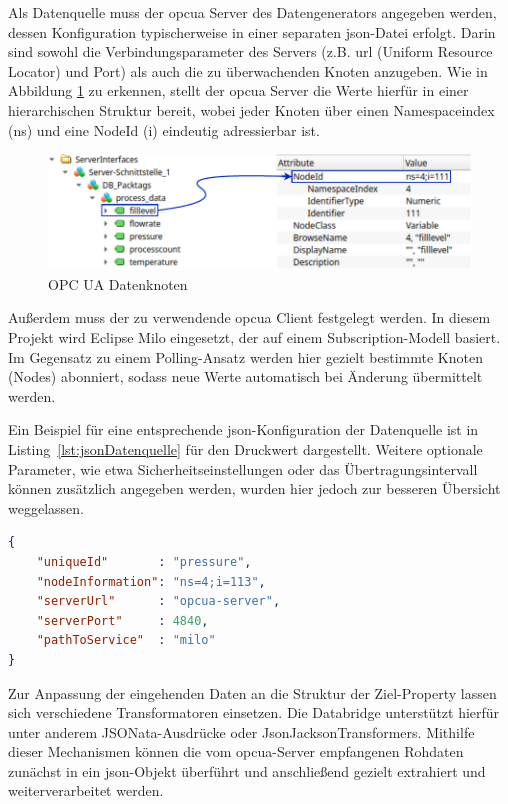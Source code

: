 Als Datenquelle muss der \acs{opcua} Server des Datengenerators angegeben werden, dessen Konfiguration typischerweise in einer separaten \acs{json}-Datei erfolgt.
Darin sind sowohl die Verbindungsparameter des Servers (z.B. \acs{url} (Uniform Resource Locator) und Port) als auch die zu überwachenden Knoten anzugeben.
Wie in Abbildung \ref{fig:OPCUADatenStruktur} zu erkennen, stellt der \acs{opcua} Server die Werte hierfür in einer hierarchischen Struktur bereit, wobei jeder Knoten über einen Namespaceindex (ns) und eine NodeId (i) eindeutig adressierbar ist.

\begin{figure}[htbp]
    \centering
    \includegraphics{Bilder/OPCUA/OPCUADaten.pdf}
    \caption{OPC UA Datenknoten}
    \label{fig:OPCUADatenStruktur}
\end{figure}

Außerdem muss der zu verwendende \acs{opcua} Client festgelegt werden.
In diesem Projekt wird Eclipse Milo eingesetzt, der auf einem Subscription-Modell basiert.
Im Gegensatz zu einem Polling-Ansatz werden hier gezielt bestimmte Knoten (Nodes) abonniert, sodass neue Werte automatisch bei Änderung übermittelt werden.

Ein Beispiel für eine entsprechende \acs{json}-Konfiguration der Datenquelle ist in Listing~\ref{lst:jsonDatenquelle} für den Druckwert dargestellt.
Weitere optionale Parameter, wie etwa Sicherheitseinstellungen oder das Übertragungsintervall können zusätzlich angegeben werden, wurden hier jedoch zur besseren Übersicht weggelassen.

\newpage
\begin{lstlisting}[language=json, caption={Beispielhafte \acs{json}-Konfiguration einer Datenquelle}, label={lst:jsonDatenquelle}]
{
    "uniqueId"       : "pressure",
    "nodeInformation": "ns=4;i=113",
    "serverUrl"      : "opcua-server",
    "serverPort"     : 4840,
    "pathToService"  : "milo"
}
\end{lstlisting}

Zur Anpassung der eingehenden Daten an die Struktur der Ziel-Property lassen sich verschiedene Transformatoren einsetzen.
Die Databridge unterstützt hierfür unter anderem JSONata-Ausdrücke oder JsonJacksonTransformers.
Mithilfe dieser Mechanismen können die vom \acs{opcua}-Server empfangenen Rohdaten zunächst in ein \acs{json}-Objekt überführt und anschließend gezielt extrahiert und weiterverarbeitet werden.

